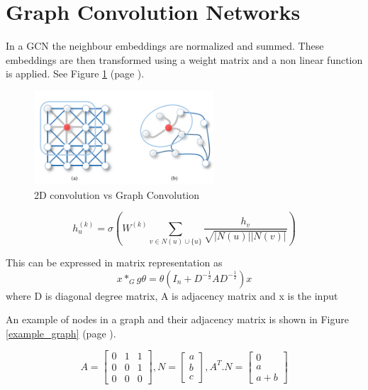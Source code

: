 \section{Graph Convolution Networks}
In a GCN the neighbour embeddings are normalized and summed. These embeddings are then transformed using a weight matrix and a non linear function is applied. See Figure \ref{GCN} (page \pageref{GCN}).
\begin{figure}
     \centering
     \includegraphics[width= 0.6\textwidth]{pics/GNN.png}
     \caption{2D convolution vs Graph Convolution}
     \label{GCN}
\end{figure}

\begin{displaymath}
    h_u^{(k)} = \sigma \left( W^{(k)} \sum_{v \in N(u) \cup \{u\}} \frac{h_v}{\sqrt{|N(u)||N(v)|}}\right)
\end{displaymath}

This can be expressed in matrix representation as
\begin{displaymath}
    x*_{G} g{\theta} =\theta(I_{n}+D^{-\frac{1}{2}}AD^{-\frac{1}{2}})x
\end{displaymath}
where D is diagonal degree matrix, A is adjacency matrix and x is the input

An example of nodes in a graph and their adjacency matrix is shown in Figure \ref{example_graph} (page \pageref{example_graph}).

\begin{displaymath}
    A = {\begin{bmatrix}
0 & 1 & 1\\
0 & 0 & 1\\
0 & 0 & 0
\end{bmatrix}}, N = {\begin{bmatrix}
    a \\ b \\c
\end{bmatrix}}, A^T.N = {\begin{bmatrix}
    0 \\ a \\ a+b
\end{bmatrix}}
\end{displaymath}

